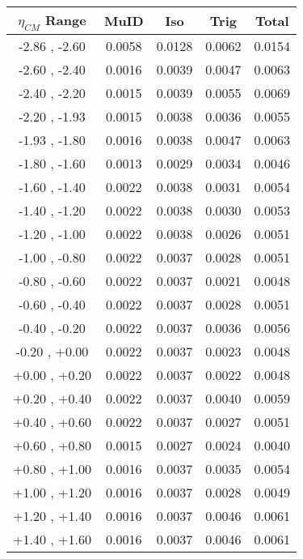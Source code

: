 \begin{table}[h!]
  \centering
  \renewcommand{\arraystretch}{1.5}
  \begin{tabular}{|c|*4c|}
    \hline
    $\eta_{CM}$ Range & MuID & Iso & Trig & Total\\
    \hline\hline
    -2.86 , -2.60 & 0.0058 & 0.0128 & 0.0062 & 0.0154\\
    \hline
    -2.60 , -2.40 & 0.0016 & 0.0039 & 0.0047 & 0.0063\\
    \hline
    -2.40 , -2.20 & 0.0015 & 0.0039 & 0.0055 & 0.0069\\
    \hline
    -2.20 , -1.93 & 0.0015 & 0.0038 & 0.0036 & 0.0055\\
    \hline
    -1.93 , -1.80 & 0.0016 & 0.0038 & 0.0047 & 0.0063\\
    \hline
    -1.80 , -1.60 & 0.0013 & 0.0029 & 0.0034 & 0.0046\\
    \hline
    -1.60 , -1.40 & 0.0022 & 0.0038 & 0.0031 & 0.0054\\
    \hline
    -1.40 , -1.20 & 0.0022 & 0.0038 & 0.0030 & 0.0053\\
    \hline
    -1.20 , -1.00 & 0.0022 & 0.0038 & 0.0026 & 0.0051\\
    \hline
    -1.00 , -0.80 & 0.0022 & 0.0037 & 0.0028 & 0.0051\\
    \hline
    -0.80 , -0.60 & 0.0022 & 0.0037 & 0.0021 & 0.0048\\
    \hline
    -0.60 , -0.40 & 0.0022 & 0.0037 & 0.0028 & 0.0051\\
    \hline
    -0.40 , -0.20 & 0.0022 & 0.0037 & 0.0036 & 0.0056\\
    \hline
    -0.20 , +0.00 & 0.0022 & 0.0037 & 0.0023 & 0.0048\\
    \hline
    +0.00 , +0.20 & 0.0022 & 0.0037 & 0.0022 & 0.0048\\
    \hline
    +0.20 , +0.40 & 0.0022 & 0.0037 & 0.0040 & 0.0059\\
    \hline
    +0.40 , +0.60 & 0.0022 & 0.0037 & 0.0027 & 0.0051\\
    \hline
    +0.60 , +0.80 & 0.0015 & 0.0027 & 0.0024 & 0.0040\\
    \hline
    +0.80 , +1.00 & 0.0016 & 0.0037 & 0.0035 & 0.0054\\
    \hline
    +1.00 , +1.20 & 0.0016 & 0.0037 & 0.0028 & 0.0049\\
    \hline
    +1.20 , +1.40 & 0.0016 & 0.0037 & 0.0046 & 0.0061\\
    \hline
    +1.40 , +1.60 & 0.0016 & 0.0037 & 0.0046 & 0.0061\\

\end{tabular}
\end{table}
